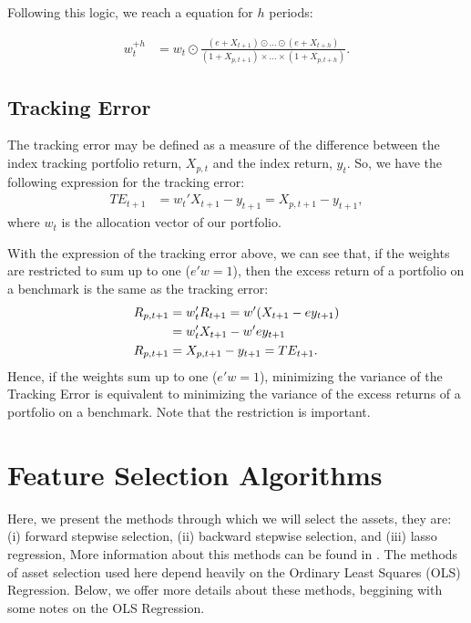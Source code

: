 \documentclass[preprint, doubleblind, authoryear,10pt]{elsarticle}
\begin{document}
Following this logic, we reach a equation for $h$ periods:

\begin{align}
	\label{eq:wplush}
	w_{t}^{+h} &= w_{t} \odot 
	\frac{(e + X_{t+1})\odot\dots\odot(e + X_{t+h})}
	{(1 + X_{p,t+1})\times \dots \times(1 + X_{p,t+h})}.
\end{align}

\subsection*{Tracking Error}

The tracking error may be defined as a measure of the difference between the index tracking portfolio return, $X_{p,t}$ and the index return, $y_{t}$.
So, we have the following expression for the tracking error:
\begin{align} 
	\label{eq:TE}
	TE_{t+1} &= w_{t}'X_{t+1} - y_{t+1} 
	= X_{p, t+1} - y_{t+1},
\end{align}
where $w_{t}$ is the allocation vector of our portfolio.

With the expression of the tracking error above, we can see that, if the weights are restricted to sum up to one ($e'w=1$), then the excess return of a portfolio on a benchmark is the same as the tracking error:
\begin{align}
	\notag
	R_{p,t+1} & = w_{t}'R_{t+1} = w'(X_{t+1} - e y_{t+1})
	\\
	\notag
	& = w_{t}'X_{t+1} - w'e y_{t+1}
	\\
	\label{eq:TER}
	R_{p,t+1} & = X_{p,t+1} - y_{t+1} = TE_{t+1}.
\end{align}
Hence, if the weights sum up to one ($e'w=1$), minimizing the variance of the Tracking Error is equivalent to minimizing the variance of the excess returns of a portfolio on a benchmark.
Note that the restriction is important.


\section{Feature Selection Algorithms} \label{sec:selection}

Here, we present the methods through which we will select the assets, they are:
(i) forward stepwise selection, 
(ii) backward stepwise selection, 
and
(iii) lasso regression,
More information about this methods can be found in \cite{isl-2014}.
The methods of asset selection used here depend heavily on the Ordinary Least Squares (OLS) Regression.
Below, we offer more details about these methods, beggining with some notes on the OLS Regression.
\end{document}
